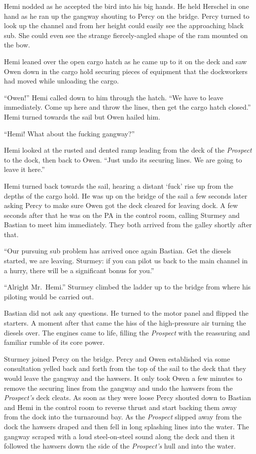 \documentclass[
]{scrbook}
\begin{document}
Hemi nodded as he accepted the bird into his big hands. He held Herschel
in one hand as he ran up the gangway shouting to Percy on the bridge.
Percy turned to look up the channel and from her height could easily see
the approaching black sub. She could even see the strange
fiercely-angled shape of the ram mounted on the bow.

Hemi leaned over the open cargo hatch as he came up to it on the deck
and saw Owen down in the cargo hold securing pieces of equipment that
the dockworkers had moved while unloading the cargo.

``Owen!'' Hemi called down to him through the hatch. ``We have to leave
immediately. Come up here and throw the lines, then get the cargo hatch
closed.'' Hemi turned towards the sail but Owen hailed him.

``Hemi! What about the fucking gangway?''

Hemi looked at the rusted and dented ramp leading from the deck of the
\emph{Prospect} to the dock, then back to Owen. ``Just undo its securing
lines. We are going to leave it here.''

Hemi turned back towards the sail, hearing a distant `fuck' rise up from
the depths of the cargo hold. He was up on the bridge of the sail a few
seconds later asking Percy to make sure Owen got the deck cleared for
leaving dock. A few seconds after that he was on the PA in the control
room, calling Sturmey and Bastian to meet him immediately. They both
arrived from the galley shortly after that.

``Our pursuing sub problem has arrived once again Bastian. Get the
diesels started, we are leaving. Sturmey: if you can pilot us back to
the main channel in a hurry, there will be a significant bonus for
you.''

``Alright Mr.~Hemi.'' Sturmey climbed the ladder up to the bridge from
where his piloting would be carried out.

Bastian did not ask any questions. He turned to the motor panel and
flipped the starters. A moment after that came the hiss of the
high-pressure air turning the diesels over. The engines came to life,
filling the \emph{Prospect} with the reassuring and familiar rumble of
its core power.

Sturmey joined Percy on the bridge. Percy and Owen established via some
consultation yelled back and forth from the top of the sail to the deck
that they would leave the gangway and the hawsers. It only took Owen a
few minutes to remove the securing lines from the gangway and undo the
hawsers from the \emph{Prospect's} deck cleats. As soon as they were
loose Percy shouted down to Bastian and Hemi in the control room to
reverse thrust and start backing them away from the dock into the
turnaround bay. As the \emph{Prospect} slipped away from the dock the
hawsers draped and then fell in long splashing lines into the water. The
gangway scraped with a loud steel-on-steel sound along the deck and then
it followed the hawsers down the side of the \emph{Prospect's} hull and
into the water.
\end{document}
